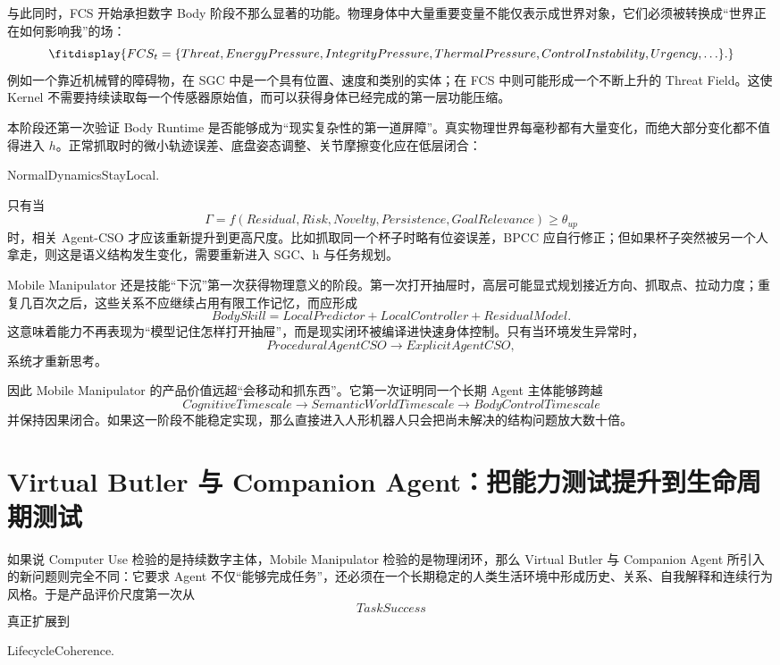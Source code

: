 与此同时，FCS 开始承担数字 Body 阶段不那么显著的功能。物理身体中大量重要变量不能仅表示成世界对象，它们必须被转换成“世界正在如何影响我”的场：
\[
\fitdisplay{
FCS_t
=
\{
Threat,
EnergyPressure,
IntegrityPressure,
ThermalPressure,
ControlInstability,
Urgency,\ldots
\}.
}
\]
例如一个靠近机械臂的障碍物，在 SGC 中是一个具有位置、速度和类别的实体；在 FCS 中则可能形成一个不断上升的 Threat Field。这使 Kernel 不需要持续读取每一个传感器原始值，而可以获得身体已经完成的第一层功能压缩。

本阶段还第一次验证 Body Runtime 是否能够成为“现实复杂性的第一道屏障”。真实物理世界每毫秒都有大量变化，而绝大部分变化都不值得进入 $h$。正常抓取时的微小轨迹误差、底盘姿态调整、关节摩擦变化应在低层闭合：
\begin{statementbox}
NormalDynamicsStayLocal.
\end{statementbox}
只有当
\[
\Gamma
=
f(
Residual,
Risk,
Novelty,
Persistence,
GoalRelevance
)
\geq
\theta_{up}
\]
时，相关 Agent-CSO 才应该重新提升到更高尺度。比如抓取同一个杯子时略有位姿误差，BPCC 应自行修正；但如果杯子突然被另一个人拿走，则这是语义结构发生变化，需要重新进入 SGC、h 与任务规划。

Mobile Manipulator 还是技能“下沉”第一次获得物理意义的阶段。第一次打开抽屉时，高层可能显式规划接近方向、抓取点、拉动力度；重复几百次之后，这些关系不应继续占用有限工作记忆，而应形成
\[
BodySkill
=
LocalPredictor
+
LocalController
+
ResidualModel.
\]
这意味着能力不再表现为“模型记住怎样打开抽屉”，而是现实闭环被编译进快速身体控制。只有当环境发生异常时，
\[
ProceduralAgentCSO
\rightarrow
ExplicitAgentCSO,
\]
系统才重新思考。

因此 Mobile Manipulator 的产品价值远超“会移动和抓东西”。它第一次证明同一个长期 Agent 主体能够跨越
\[
CognitiveTimescale
\rightarrow
SemanticWorldTimescale
\rightarrow
BodyControlTimescale
\]
并保持因果闭合。如果这一阶段不能稳定实现，那么直接进入人形机器人只会把尚未解决的结构问题放大数十倍。

\section{Virtual Butler 与 Companion Agent：把能力测试提升到生命周期测试}

如果说 Computer Use 检验的是持续数字主体，Mobile Manipulator 检验的是物理闭环，那么 Virtual Butler 与 Companion Agent 所引入的新问题则完全不同：它要求 Agent 不仅“能够完成任务”，还必须在一个长期稳定的人类生活环境中形成历史、关系、自我解释和连续行为风格。于是产品评价尺度第一次从
\[
TaskSuccess
\]
真正扩展到
\begin{statementbox}
LifecycleCoherence.
\end{statementbox}

